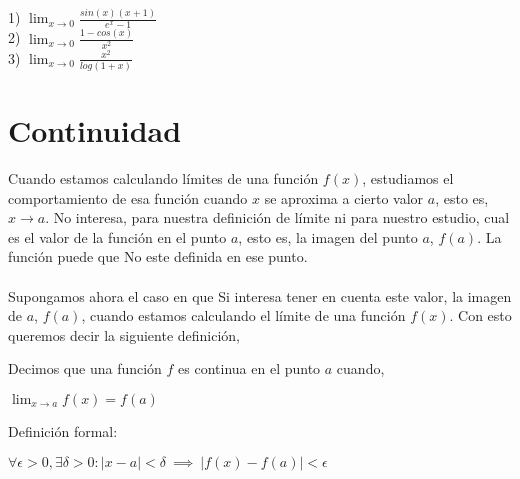 \documentclass[11pt, a4paper]{article}
\begin{document}
{1) $ \displaystyle \lim_{x \to 0} \frac{sin(x)(x+1)}{e^{x}-1} $ \\

2) $ \displaystyle \lim_{x \to 0} \frac{1-cos(x)}{x^2} $ \\

3) $ \displaystyle \lim_{x \to 0} \frac{x^2}{log(1+x)} $ \\

\newpage

\section{Continuidad}
Cuando estamos calculando l\'imites de una funci\'on $f(x)$, estudiamos el comportamiento de esa funci\'on cuando $x$ se aproxima a cierto valor $a$, esto es, $x \to a$. No interesa, para nuestra definici\'on de l\'imite ni para nuestro estudio, cual es el valor de la funci\'on en el punto $a$, esto es, la imagen del punto $a$, $f(a)$. La funci\'on puede que No este definida en ese punto. \\ \\
Supongamos ahora el caso en que Si interesa tener en cuenta este valor, la imagen de $a$, $f(a)$, cuando estamos calculando el l\'imite de una funci\'on $f(x)$. Con esto queremos decir la siguiente definici\'on, \\
\begin{center}
    Decimos que una funci\'on $f$ es {\color{blue}continua} en el punto $a$ cuando, \\ \hfill

    {\color{blue}$ \displaystyle \lim_{x \to a} f(x) = f(a)  $} \\ \hfill

    Definici\'on formal: \\ \hfill

    $\forall \epsilon > 0, \exists \delta > 0 : |x-a|<\delta ~ \implies ~ |f(x) - f(a)|< \epsilon  $
\end{center}

}
\end{document}
